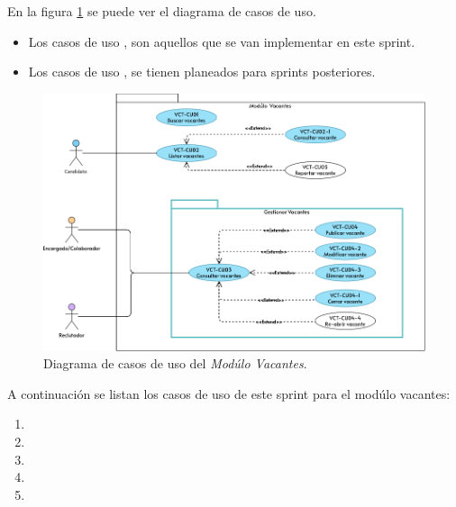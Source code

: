 En la figura \ref{dcu:MUVCT} se puede ver el diagrama de casos de uso.
\begin{itemize}
    \item Los casos de uso \IUazul{} , son aquellos que se van implementar en este sprint.
    \item Los casos de uso \IUblanco{}, se tienen planeados para sprints posteriores.
\end{itemize} 

\begin{figure}[H]
    \begin{center}
        \includegraphics[width=.7\textwidth]{sprints/imagenes/MUVCT.png}
    \end{center}
    \caption{Diagrama de casos de uso del \textit{Modúlo Vacantes}.}
    \label{dcu:MUVCT}
\end{figure}

A continuación se listan los casos de uso de este sprint para el modúlo vacantes:
\begin{enumerate}
    \item {}
    \item {} 
    \item {} 
    \item {}
    \item {}
\end{enumerate} 



